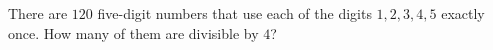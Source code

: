 There are $120$ five-digit numbers that use each of the digits $1,2,3,4,5$ exactly once. How many of them are divisible by $4$?
